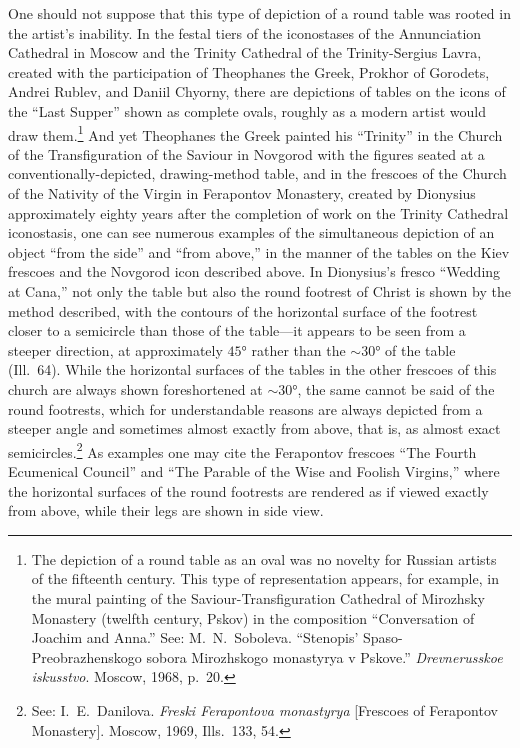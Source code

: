 One should not suppose that this type of depiction of a round table was rooted in the
artist's inability.  In the festal tiers of the iconostases of the Annunciation Cathedral
in Moscow and the Trinity Cathedral of the Trinity-Sergius Lavra, created with the
participation of Theophanes the Greek, Prokhor of Gorodets, Andrei Rublev, and Daniil
Chyorny, there are depictions of tables on the icons of the ``Last Supper'' shown as
complete ovals, roughly as a modern artist would draw them.\footnote{The depiction of a
  round table as an oval was no novelty for Russian artists of the fifteenth century.
  This type of representation appears, for example, in the mural painting of the
  Saviour-Transfiguration Cathedral of Mirozhsky Monastery (twelfth century, Pskov) in
  the composition ``Conversation of Joachim and Anna.''  See: M.~N.~Soboleva.
  ``Stenopis' Spaso-Preobrazhenskogo sobora Mirozhskogo monastyrya v Pskove.''
  \emph{Drevnerusskoe iskusstvo}.  Moscow, 1968, p.~20.}  And yet Theophanes the Greek
painted his ``Trinity'' in the Church of the Transfiguration of the Saviour in Novgorod
with the figures seated at a conventionally-depicted, drawing-method table, and in the
frescoes of the Church of the Nativity of the Virgin in Ferapontov Monastery, created by
Dionysius approximately eighty years after the completion of work on the Trinity Cathedral
iconostasis, one can see numerous examples of the simultaneous depiction of an object
``from the side'' and ``from above,'' in the manner of the tables on the Kiev frescoes
and the Novgorod icon described above.  In Dionysius's fresco ``Wedding at Cana,'' not
only the table but also the round footrest of Christ is shown by the method described,
with the contours of the horizontal surface of the footrest closer to a semicircle than
those of the table---it appears to be seen from a steeper direction, at approximately
$45°$ rather than the $\sim\!30°$ of the table (Ill.~64).  While the horizontal surfaces
of the tables in the other frescoes of this church are always shown foreshortened at
$\sim\!30°$, the same cannot be said of the round footrests, which for understandable
reasons are always depicted from a steeper angle and sometimes almost exactly from above,
that is, as almost exact semicircles.\footnote{See: I.~E.~Danilova.  \emph{Freski
  Ferapontova monastyrya} [Frescoes of Ferapontov Monastery].  Moscow, 1969,
  Ills.~133, 54.}  As examples one may cite the Ferapontov frescoes ``The Fourth
Ecumenical Council'' and ``The Parable of the Wise and Foolish Virgins,'' where the
horizontal surfaces of the round footrests are rendered as if viewed exactly from above,
while their legs are shown in side view.

